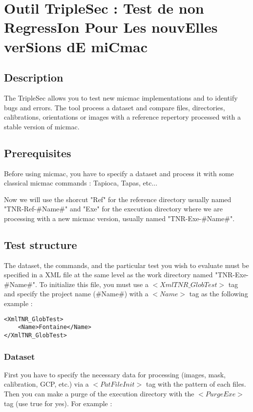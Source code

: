 \documentclass[a4paper]{book}
\begin{document}
\chapter{Outil TripleSec : Test de non RegressIon Pour Les nouvElles verSions dE miCmac}

\section{Description}
The TripleSec allows you to test new micmac implementations and to identify bugs and errors. The tool process a dataset and compare files, directories, calibrations, orientations or images with a reference repertory processed with a stable version of micmac.

\section{Prerequisites}
Before using micmac, you have to specify a dataset and process it with some classical micmac commands : Tapioca, Tapas, etc...

Now we will use the shorcut "Ref" for the reference directory usually named "TNR-Ref-\#Name\#" and "Exe" for the execution directory where we are processing with a new micmac version, usually named "TNR-Exe-\#Name\#".

\section{Test structure}
The dataset, the commands, and the particular test you wish to evaluate must be specified in a XML file at the same level as the work directory named "TNR-Exe-\#Name\#".
To initialize this file, you must use a $<XmlTNR\_GlobTest>$ tag and specify the project name (\#Name\#) with a $<Name>$ tag as the following example :

\begin{lstlisting}
<XmlTNR_GlobTest>
	<Name>Fontaine</Name>
</XmlTNR_GlobTest>
\end{lstlisting}

\subsection{Dataset}
First you have to specify the necessary data for processing (images, mask, calibration, GCP, etc.) via a $<PatFileInit>$ tag with the pattern of each files. Then you can make a purge of the execution directory with the $<PurgeExe>$ tag (use true for yes). For example :
\end{document}
